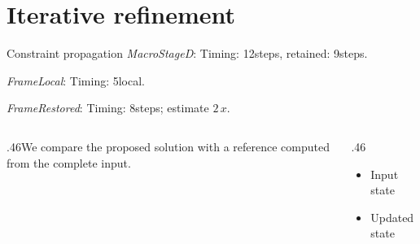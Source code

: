\documentclass[10pt,aspectratio=169]{beamer}
\newcommand{\fuzzlayerA}[1]{\textit{#1}}
\newcommand{\fuzzlayerB}[1]{\fuzzlayerA{#1}}
\newcommand{\fuzzterm}[1]{\fuzzlayerB{#1}}
\newcommand{\fuzzpair}[2]{\fuzzterm{#1}: #2}
\newcommand{\fuzzunit}{steps}
\let\fuzzoriginalunit\fuzzunit
\newcommand{\fuzzcoefficient}{2}
\newcommand{\fuzzscale}[2][\fuzzcoefficient]{#1\,#2}
\begin{document}
\section{Iterative refinement}
\begin{frame}[t]{Constraint propagation}
\fuzzpair{MacroStageD}{Timing: 12\fuzzunit, retained: 9\fuzzoriginalunit.}\par
{\renewcommand{\fuzzunit}{local}\fuzzpair{FrameLocal}{Timing: 5\fuzzunit.}\par}
\fuzzpair{FrameRestored}{Timing: 8\fuzzunit; estimate $\fuzzscale{x}$.}\par
\begin{columns}[T]\begin{column}{.46\textwidth}We compare the proposed solution with a reference computed from the complete input.\end{column}\begin{column}{.46\textwidth}\begin{itemize}\item Input state\item Updated state\end{itemize}\end{column}\end{columns}
\end{frame}
\end{document}
